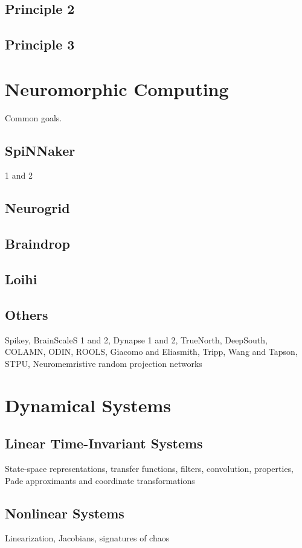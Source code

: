 \subsection{Principle 2}

\subsection{Principle 3}


\section{Neuromorphic Computing}

Common goals.

\subsection{SpiNNaker}

1 and 2

\subsection{Neurogrid}

\subsection{Braindrop}

\subsection{Loihi}

\subsection{Others}

Spikey, BrainScaleS 1 and 2, Dynapse 1 and 2, TrueNorth, DeepSouth, COLAMN, ODIN, ROOLS, Giacomo and Eliasmith, Tripp, Wang and Tapson, STPU, Neuromemristive random projection networks


\section{Dynamical Systems}

\subsection{Linear Time-Invariant Systems}

State-space representations, transfer functions, filters, convolution, properties, Pade approximants and coordinate transformations

\subsection{Nonlinear Systems}

Linearization, Jacobians, signatures of chaos

